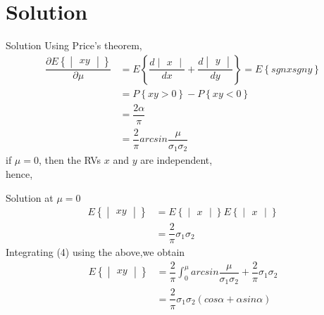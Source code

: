 \documentclass{beamer}
\providecommand{\cbrak}[1]{\ensuremath{\left\{#1\right\}}}
\newcommand{\mydet}[1]{\ensuremath{\begin{vmatrix}#1\end{vmatrix}}}
\providecommand{\cbrak}[1]{\ensuremath{\left\{#1\right\}}}
\begin{document}
    \section{Solution}
        \begin{frame}{Solution}
        Using Price's theorem,
        \begin{align}
        \dfrac{\partial E \cbrak{ \mydet{xy}}}{\partial \mu} &= E \cbrak{ \dfrac{d \mydet{x}}{dx} + \dfrac{d \mydet{y}}{dy}} = E \cbrak{sgnx sgny}\\[9pt]
        &= P \cbrak{xy > 0} - P \cbrak{xy < 0} \\[9pt]
        &= \dfrac{2 \alpha}{\pi}\\[9pt] 	
        &=\dfrac{2}{\pi} arcsin{\dfrac{\mu}{\sigma_1 \sigma_2}}
        \end{align}
        if $\mu = 0$, then the RVs $x$ and $y$ are independent,\\[9pt] hence,\\
       
        \end{frame}
    \begin{frame}{Solution}
    at $\mu = 0$
	\begin{align*}
	 E \cbrak{ \mydet{xy}} &= E \cbrak{\mydet x} E \cbrak{\mydet x}\\[9pt]
	  &= \dfrac{2}{\pi} \sigma_1 \sigma_2
	\end{align*}	    
Integrating (4) using the above,we obtain
	\begin{align*}
	E \cbrak{ \mydet{xy}} &= \dfrac{2}{\pi} \int_{ 0}^{\mu} arcsin{\dfrac{\mu}{\sigma_1 \sigma_2}} + \dfrac{2}{\pi} \sigma_1 \sigma_2 \\[9pt]
	&= \dfrac{2}{\pi} \sigma_1 \sigma_2 (cos{\alpha} + \alpha sin{\alpha})
	\end{align*}
 
    \end{frame}
\end{document}
